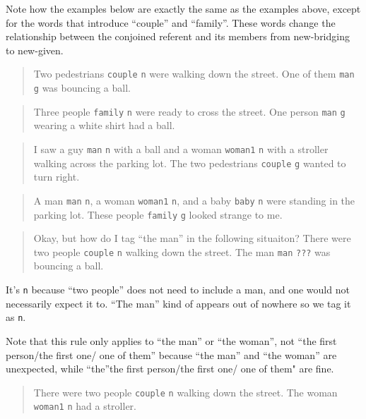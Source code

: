 \documentclass[
]{book}
\begin{document}
Note how the examples below are exactly the same as the examples above, except for the words that introduce ``couple'' and ``family''. These words change the relationship between the conjoined referent and its members from new-bridging to new-given.

\begin{quote}
Two pedestrians \texttt{couple} \texttt{n} were walking down the street.
One of them \texttt{man} \texttt{g} was bouncing a ball.
\end{quote}

\begin{quote}
Three people \texttt{family} \texttt{n} were ready to cross the street.
One person \texttt{man} \texttt{g} wearing a white shirt had a ball.
\end{quote}

\begin{quote}
I saw a guy \texttt{man} \texttt{n} with a ball and a woman \texttt{woman1} \texttt{n} with a stroller walking across the parking lot.
The two pedestrians \texttt{couple} \texttt{g} wanted to turn right.
\end{quote}

\begin{quote}
A man \texttt{man} \texttt{n}, a woman \texttt{woman1} \texttt{n}, and a baby \texttt{baby} \texttt{n} were standing in the parking lot.
These people \texttt{family} \texttt{g} looked strange to me.
\end{quote}

\begin{quote}
Okay, but how do I tag ``the man'' in the following situaiton?
There were two people \texttt{couple} \texttt{n} walking down the street.
The man \texttt{man} \texttt{???} was bouncing a ball.
\end{quote}

It's \texttt{n} because
``two people'' does not need to include a man, and one would not necessarily
expect it to.
``The man'' kind of appears out of nowhere so we tag it as \texttt{n}.

Note that this rule only applies to ``the man'' or ``the woman'', not ``the first person/the first one/ one of them''
because ``the man'' and ``the woman'' are unexpected, while ``the''the first person/the first one/ one of them" are fine.

\begin{quote}
There were two people \texttt{couple} \texttt{n} walking down the street.
The woman \texttt{woman1} \texttt{n} had a stroller.
\end{quote}
\end{document}
